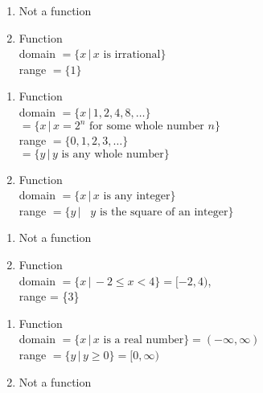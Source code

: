 \documentclass{ximera}
\begin{document}
\begin{enumerate}

\item  Not a function

 

 

\item Function \\ domain $= \{x \, | \, \text{$x$ is irrational} \}$ \\ range $= \{ 1\}$

\end{enumerate}


\begin{enumerate}

\item Function \\ domain  $= \{x \, | \, 1, 2, 4, 8, \ldots \}$ \\ $= \{x \, | \, \text{$x = 2^{n}$ for some whole number $n$} \}$ \\ range $= \{ 0, 1, 2, 3, \ldots \}$ \\ $= \{y \, | \, \text{$y$ is any whole number}\}$

 

 

\item Function \\ domain $= \{x \, | \, \text{$x$ is any integer} \}$ \\ range $= \{y \, | \, \text{ $y$ is the square of an integer}\}$

\end{enumerate}


\begin{enumerate}

\item Not a function

 

 

\item Function \\ domain  $= \{x \, | \, -2 \leq x < 4 \} = [-2, 4)$, \\ range = \{$3$\}

\end{enumerate}


\begin{enumerate}


\item Function \\ domain $= \{x \, | \,  \text{$x$ is a real number} \} = (-\infty, \infty)$ \\  range $= \{y \, | \,  y \geq 0 \} = [0,\infty)$

 

 

\item  Not a function

\end{enumerate}
\end{document}
